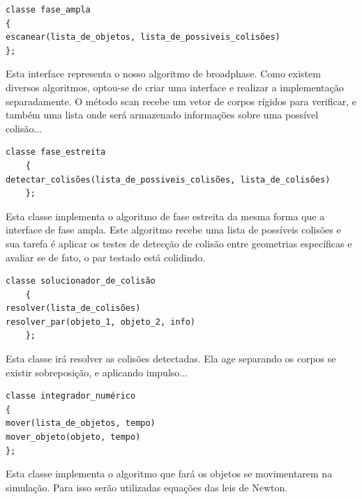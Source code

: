 \begin{lstlisting}[frame=single,caption=Código de exemplo\label{codigo1}]
classe fase_ampla
{
escanear(lista_de_objetos, lista_de_possiveis_colisões)
};
\end{lstlisting}

Esta interface representa o nosso algoritmo de broadphase. Como existem
diversos algoritmos, optou-se de criar uma interface e realizar a implementação
separadamente.
O método scan recebe um vetor de corpos rígidos para verificar, e também uma
lista onde será armazenado informações sobre uma possível colisão...

\begin{lstlisting}[frame=single,caption=Código de exemplo\label{codigo1}]
classe fase_estreita
    {
detectar_colisões(lista_de_possiveis_colisões, lista_de_colisões)
    };
\end{lstlisting}

Esta classe implementa o algoritmo de fase estreita da mesma forma que a interface
de fase ampla. Este algoritmo recebe uma lista de possíveis colisões e sua
tarefa é aplicar os testes de detecção de colisão entre geometrias específicas
e avaliar se de fato, o par testado está colidindo.

\begin{lstlisting}[frame=single,caption=Código de exemplo\label{codigo1}]
classe solucionador_de_colisão
    {
resolver(lista_de_colisões)
resolver_par(objeto_1, objeto_2, info)
    };
\end{lstlisting}

Esta classe irá resolver as colisões detectadas. Ela age separando os corpos se
existir sobreposição, e aplicando impulso...

\begin{lstlisting}[frame=single,caption=Código de exemplo\label{codigo1}]
classe integrador_numérico
{
mover(lista_de_objetos, tempo)
mover_objeto(objeto, tempo)
};
\end{lstlisting}

 Esta classe implementa o algoritmo que fará os objetos se movimentarem na simulação. Para isso serão utilizadas equações das leis de Newton.

